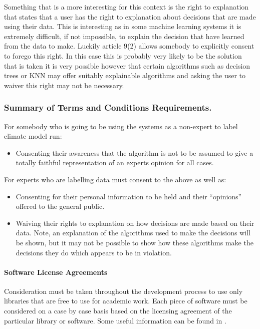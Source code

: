 \documentclass{ecmm427_assignment}
\begin{document}
Something that is a more interesting for this context is the right
to explanation that states that a user has the right to explanation
about decisions that are made using their data. This is interesting
as in some machine learning systems it is extremely difficult, if
not impossible, to explain the decision that have learned from the
data to make. Luckily article 9(2) allows somebody to explicitly consent
to forego this right. In this case this is probably very likely to
be the solution that is taken it is very possible however that certain
algorithms such as decision trees or KNN may offer suitably explainable
algorithms and asking the user to waiver this right may not be necessary. 

\subsubsection{Summary of Terms and Conditions Requirements.}

For somebody who is going to be using the systems as a non-expert
to label climate model run:
\begin{itemize}
\item Consenting their awareness that the algorithm is not to be assumed
to give a totally faithful representation of an experts opinion for
all cases.
\end{itemize}
For experts who are labelling data must consent to the above as well
as:
\begin{itemize}
\item Consenting for their personal information to be held and their ``opinions''
offered to the general public.
\item Waiving their rights to explanation on how decisions are made based
on their data. Note, an explanation of the algorithms used to make
the decisions will be shown, but it may not be possible to show how
these algorithms make the decisions they do which appears to be in
violation.
\end{itemize}

\paragraph{Software License Agreements}

Consideration must be taken throughout the development process to use
only libraries that are free to use for academic work. Each piece of software must 
be considered on a case by case basis based on the licensing agreement of
the particular library or software. Some useful information can be found in \cite{ethicalandlegal}.
\end{document}
